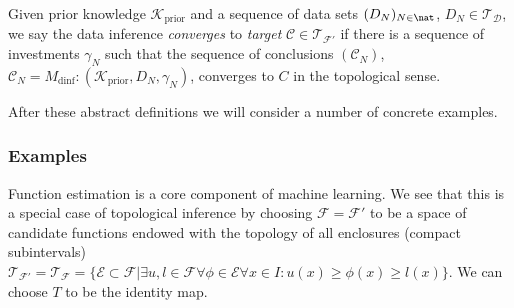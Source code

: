 Given prior knowledge $\mathcal K_{\text{prior}}$ and a sequence of data sets $(D_N)_{N \in \nat}$, $D_N\in \mathcal T_{\mathcal D}$, we say the data inference \textit{converges} to \textit{target} $\mathcal C \in \mathcal T_{\mathcal F'}$ if there is a sequence of investments $\gamma_N$ such that the sequence of conclusions $(\mathcal C_N)$, $\mathcal C_N =  M_{\text{dinf}} : (\mathcal K_{\text{prior}}, D_N,\gamma_N) $, converges to $C$ in the topological sense.

After these abstract definitions we will consider a number of concrete examples.
\subsubsection{Examples}
 \begin{ex}  Function estimation is a core component of machine learning. We see that this is a special case of topological inference by choosing $\mathcal F= \mathcal F'$ to be a space of candidate functions endowed with the topology of all enclosures (compact subintervals) $\mathcal T_{\mathcal F'}=\mathcal T_{\mathcal F}= \{ \mathcal E \subset \mathcal F | \exists u,l \in \mathcal F\forall \phi \in \mathcal E\forall x \in I: u(x) \geq \phi(x) \geq l(x) \} $. We can choose $T$ to be the identity map.
\end{ex}

